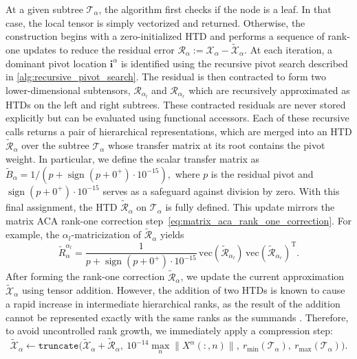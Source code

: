 \documentclass{article}
\theoremstyle{plain}
\theoremstyle{definition}
\theoremstyle{remark}
\begin{document}
At a given subtree $\mathcal{T}_{\alpha}$, the algorithm first checks if the node is a leaf. In that case, the local tensor is simply vectorized and returned. Otherwise, the construction begins with a zero-initialized HTD and performs a sequence of rank-one updates to reduce the residual error $\mathcal{R}_{\alpha} := \mathcal{X}_{\alpha} - \widetilde{\mathcal{X}}_{\alpha}$. At each iteration, a dominant pivot location \(\bm{i}^\alpha\) is identified using the recursive pivot search described in \cref{alg:recursive_pivot_search}. The residual is then contracted to form two lower-dimensional subtensors, \(\mathcal{R}_{\alpha_l}\) and \(\mathcal{R}_{\alpha_r}\) which are recursively approximated as HTDs on the left and right subtrees. These contracted residuals are never stored explicitly but can be evaluated using functional accessors. Each of these recursive calls returns a pair of hierarchical representations, which are merged into an HTD \(\widetilde{\mathcal{R}}_{\alpha}\) over the subtree $\mathcal{T}_{\alpha}$ whose transfer matrix at its root contains the pivot weight. In particular, we define the scalar transfer matrix as
\(
        \widetilde{B}_\alpha = 1/(p + \operatorname{sign}(p + 0^+)\cdot 10^{-15}),
\)
where \(p\) is the residual pivot and \( \operatorname{sign}(p + 0^+) \cdot 10^{-15} \) serves as a safeguard against division by zero. With this final assignment, the HTD \(\widetilde{\mathcal{R}}_\alpha\) on \(\mathcal{T}_\alpha\) is fully defined. This update mirrors the matrix ACA rank-one correction step~\eqref{eq:matrix_aca_rank_one_correction}. For example, the \(\alpha_l\)-matricization of \(\widetilde{\mathcal{R}}_{\alpha}\) yields
\begin{equation*}
\widetilde{R}_{\alpha}^{\alpha_l} = \frac{1}{p + \operatorname{sign}(p + 0^+)\cdot 10^{-15}}\, \text{vec}(\widetilde{\mathcal{R}}_{\alpha_l}) \, \text{vec}(\widetilde{\mathcal{R}}_{\alpha_r})^\mathrm{T}.    
\end{equation*}
After forming the rank-one correction \(\widetilde{\mathcal{R}}_{\alpha}\), we update the current approximation $\widetilde{\mathcal{X}}_{\alpha}$ using tensor addition. However, the addition of two HTDs is known to cause a rapid increase in intermediate hierarchical ranks, as the result of the addition cannot be represented exactly with the same ranks as the summands \cite{kressner2012htucker}. Therefore, to avoid uncontrolled rank growth, we immediately apply a compression step:
\[
\widetilde{\mathcal{X}}_{\alpha} \gets \texttt{truncate} \Big(\widetilde{\mathcal{X}}_{\alpha} + \widetilde{\mathcal{R}}_{\alpha},~10^{-14} \max_n \| X^{\alpha}(:,n) \|,~r_{\min}(\mathcal{T}_\alpha),~r_{\max}(\mathcal{T}_\alpha) \Big).
\]
\end{document}

